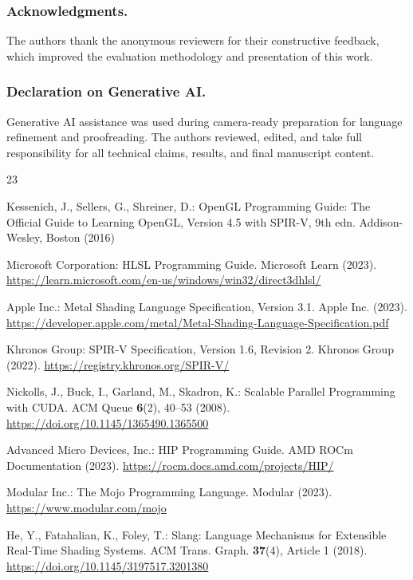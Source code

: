 \documentclass{svproc}
\begin{document}
\subsubsection{Acknowledgments.} The authors thank the anonymous reviewers for their constructive feedback, which improved the evaluation methodology and presentation of this work.

\subsubsection{Declaration on Generative AI.} Generative AI assistance was used during camera-ready preparation for language refinement and proofreading. The authors reviewed, edited, and take full responsibility for all technical claims, results, and final manuscript content.

\begin{thebibliography}{23}

Kessenich, J., Sellers, G., Shreiner, D.: OpenGL Programming Guide: The Official Guide to Learning OpenGL, Version 4.5 with SPIR-V, 9th edn.
Addison-Wesley, Boston (2016)

Microsoft Corporation: HLSL Programming Guide.
Microsoft Learn (2023).
\url{https://learn.microsoft.com/en-us/windows/win32/direct3dhlsl/}

Apple Inc.: Metal Shading Language Specification, Version 3.1.
Apple Inc. (2023).
\url{https://developer.apple.com/metal/Metal-Shading-Language-Specification.pdf}

Khronos Group: SPIR-V Specification, Version 1.6, Revision 2.
Khronos Group (2022).
\url{https://registry.khronos.org/SPIR-V/}

Nickolls, J., Buck, I., Garland, M., Skadron, K.: Scalable Parallel Programming with CUDA.
ACM Queue \textbf{6}(2), 40--53 (2008).
\url{https://doi.org/10.1145/1365490.1365500}

Advanced Micro Devices, Inc.: HIP Programming Guide.
AMD ROCm Documentation (2023).
\url{https://rocm.docs.amd.com/projects/HIP/}

Modular Inc.: The Mojo Programming Language.
Modular (2023).
\url{https://www.modular.com/mojo}

He, Y., Fatahalian, K., Foley, T.: Slang: Language Mechanisms for Extensible Real-Time Shading Systems.
ACM Trans. Graph. \textbf{37}(4), Article 1 (2018).
\url{https://doi.org/10.1145/3197517.3201380}


\end{thebibliography}
\end{document}
